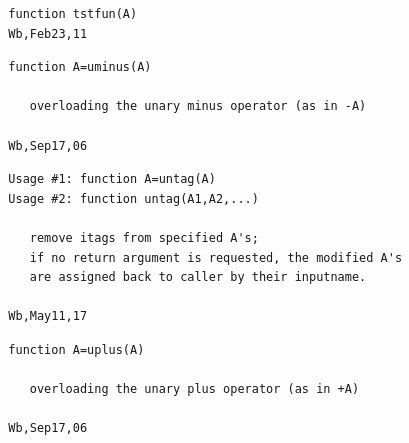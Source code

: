\documentclass[twoside,12pt]{article}
\begin{document}
\pagebreak[3]



\begin{verbatim}
  function tstfun(A)
  Wb,Feb23,11
\end{verbatim}

\pagebreak[3]



\begin{verbatim}
  function A=uminus(A)
 
     overloading the unary minus operator (as in -A)
 
  Wb,Sep17,06
\end{verbatim}

\pagebreak[3]



\begin{verbatim}
  Usage #1: function A=untag(A)
  Usage #2: function untag(A1,A2,...)
 
     remove itags from specified A's;
     if no return argument is requested, the modified A's
     are assigned back to caller by their inputname.
 
  Wb,May11,17
\end{verbatim}

\pagebreak[3]



\begin{verbatim}
  function A=uplus(A)
 
     overloading the unary plus operator (as in +A)
 
  Wb,Sep17,06
\end{verbatim}
\end{document}
